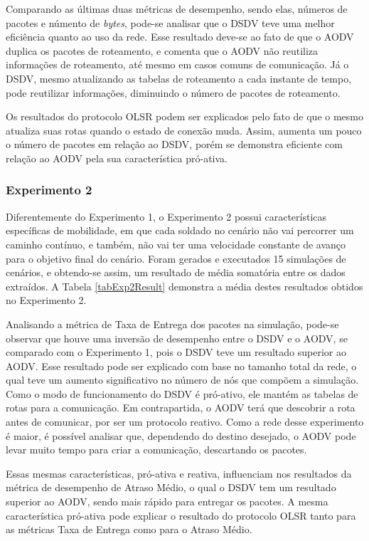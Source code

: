 Comparando as \'ultimas duas m\'etricas de desempenho, sendo elas, n\'umeros de pacotes e n\'umento de \textit{bytes}, pode-se analisar que o DSDV teve uma melhor efici\^encia quanto ao uso da rede. 
Esse resultado deve-se ao fato de que o AODV duplica os pacotes de roteamento, e \cite{ramachandran} comenta que o AODV n\~ao reutiliza informa\c{c}\~oes de roteamento, at\'e mesmo em casos comuns de comunica\c{c}\~ao.
J\'a o DSDV, mesmo atualizando as tabelas de roteamento a cada instante de tempo, pode reutilizar informa\c{c}\~oes, diminuindo o n\'umero de pacotes de roteamento. 

Os resultados do protocolo OLSR podem ser explicados pelo fato de que o mesmo atualiza suas rotas quando o estado de conex\~ao muda. Assim, aumenta um pouco o n\'umero de pacotes em rela\c{c}\~ao ao DSDV, por\'em se demonstra eficiente com rela\c{c}\~ao ao AODV pela sua caracter\'istica pr\'o-ativa.

\subsubsection{Experimento 2}
Diferentemente do Experimento 1, o Experimento 2 possui caracter\'isticas espec\'ificas de mobilidade, em que cada soldado no cen\'ario n\~ao vai percorrer um caminho cont\'inuo, e tamb\'em, n\~ao vai ter uma velocidade constante de avan\c{c}o para o objetivo final do cen\'ario.
Foram gerados e executados 15 simula\c{c}\~oes de cen\'arios, e obtendo-se assim, um resultado de m\'edia somat\'oria entre os dados extra\'idos.
A Tabela \ref{tabExp2Result} demonstra a m\'edia destes resultados obtidos no Experimento 2.

Analisando a m\'etrica de Taxa de Entrega dos pacotes na simula\c{c}\~ao, pode-se observar que houve uma invers\~ao de desempenho entre o DSDV e o AODV, se comparado com o Experimento 1, pois o DSDV teve um resultado superior ao AODV.
Esse resultado pode ser explicado com base no tamanho total da rede, o qual teve um aumento significativo no n\'umero de n\'os que comp\~oem a simula\c{c}\~ao.
Como o modo de funcionamento do DSDV \'e pr\'o-ativo, ele mant\'em as tabelas de rotas para a comunica\c{c}\~ao. Em contrapartida, o AODV ter\'a que descobrir a rota antes de comunicar, por ser um protocolo reativo.
Como a rede desse experimento \'e maior, \'e poss\'ivel analisar que, dependendo do destino desejado, o AODV pode levar muito tempo para criar a comunica\c{c}\~ao, descartando os pacotes.

Essas mesmas caracter\'isticas, pr\'o-ativa e reativa, influenciam nos resultados da m\'etrica de desempenho de Atraso M\'edio, o qual o DSDV tem um resultado superior ao AODV, sendo mais r\'apido para entregar os pacotes.
A mesma caracter\'istica pr\'o-ativa pode explicar o resultado do protocolo OLSR tanto para as m\'etricas Taxa de Entrega como para o Atraso M\'edio.

